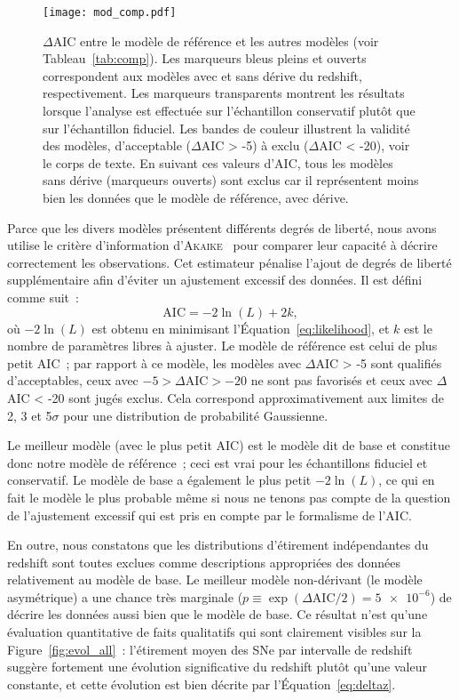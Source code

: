 \documentclass[../main/main.tex]{subfiles}
\begin{document}
\begin{figure}[ht]
    \texttt{[image: mod\_comp.pdf]}
    \caption[$\Delta$AIC entre le modèle de base et les autres
    modèles]{$\Delta$AIC entre le modèle de référence et les autres
        modèles (voir Tableau~\ref{tab:comp}). Les marqueurs bleus pleins et
        ouverts correspondent aux modèles avec et sans dérive du redshift,
        respectivement. Les marqueurs transparents montrent les résultats
        lorsque l'analyse est effectuée sur l'échantillon conservatif plutôt que
        sur l'échantillon fiduciel. Les bandes de couleur illustrent la validité
        des modèles, d'acceptable ($\Delta$AIC > -5) à exclu ($\Delta$AIC <
        -20), voir le corps de texte. En suivant ces valeurs d'AIC, tous les
        modèles sans dérive (marqueurs ouverts) sont exclus car il représentent
    moins bien les données que le modèle de référence, avec dérive.}
    \label{fig:mod_comp}
\end{figure}

Parce que les divers modèles présentent différents degrés de liberté, nous avons
utilise le critère d'information d'\textsc{Akaike}~\citep[AIC, voir par
exemple][]{burnham2004} pour comparer leur capacité à décrire correctement les
observations. Cet estimateur pénalise l'ajout de degrés de liberté
supplémentaire afin d'éviter un ajustement excessif des données. Il est défini
comme suit~:
\begin{equation}\label{eq:aic}
    \mathrm{AIC} = -2\ln(L) + 2k,
\end{equation}
où $-2\ln(L)$ est obtenu en minimisant l'Équation~\ref{eq:likelihood}, et $k$
est le nombre de paramètres libres à ajuster. Le modèle de référence est celui
de plus petit AIC~; par rapport à ce modèle, les modèles avec $\Delta$AIC > -5
sont qualifiés d'acceptables, ceux avec $-5 > \Delta\mathrm{AIC} > -20$ ne sont
pas favorisés et ceux avec $\Delta$AIC < -20 sont jugés exclus. Cela correspond
approximativement aux limites de 2, 3 et 5$\sigma$ pour une distribution de
probabilité Gaussienne.

Le meilleur modèle (avec le plus petit AIC) est le modèle dit de base et
constitue donc notre modèle de référence~; ceci est vrai pour les échantillons
fiduciel et conservatif. Le modèle de base a également le plus petit $-2\ln(L)$,
ce qui en fait le modèle le plus probable même si nous ne tenons pas compte de
la question de l'ajustement excessif qui est pris en compte par le formalisme de
l'AIC.

En outre, nous constatons que les distributions d'étirement indépendantes du
redshift sont toutes exclues comme descriptions appropriées des données
relativement au modèle de base. Le meilleur modèle  non-dérivant (le modèle
asymétrique) a une chance très marginale ($p \equiv \exp(\Delta\mathrm{AIC}/2) =
\num{5e-6}$) de décrire les données aussi bien que le modèle de base. Ce
résultat n'est qu'une évaluation quantitative de faits qualitatifs qui sont
clairement visibles sur la Figure~\ref{fig:evol_all}~: l'étirement moyen des SNe
par intervalle de redshift suggère fortement une évolution significative du
redshift plutôt qu'une valeur constante, et cette évolution est bien décrite par
l'Équation~\ref{eq:deltaz}.
\end{document}

